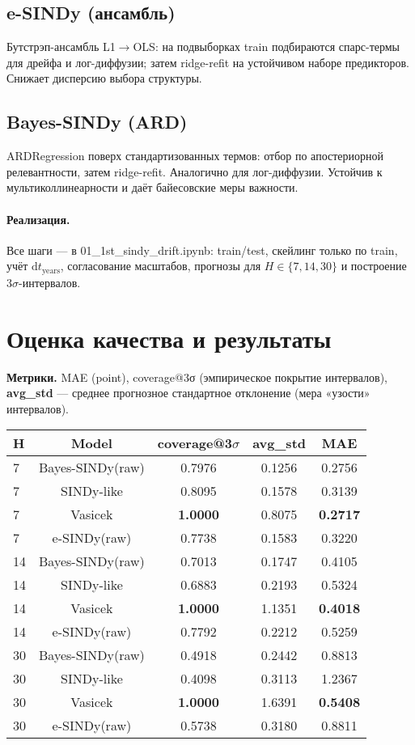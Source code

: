 \documentclass[14pt]{extarticle}
\begin{document}
\subsection*{e-SINDy (ансамбль)}
Бутстрэп-ансамбль L1$\to$OLS: на подвыборках {train} подбираются спарс-термы для дрейфа и лог-диффузии; затем ridge-refit на устойчивом наборе предикторов. Снижает дисперсию выбора структуры.

\subsection*{Bayes-SINDy (ARD)}
{ARDRegression} поверх стандартизованных термов: отбор по апостериорной релевантности, затем ridge-refit. Аналогично для лог-диффузии. Устойчив к мультиколлинеарности и даёт байесовские меры важности.

\paragraph{Реализация.}
Все шаги — в {01\_1st\_sindy\_drift.ipynb}: {train/test}, скейлинг только по {train}, учёт $\mathrm{d}t_{\text{years}}$, согласование масштабов, прогнозы для $H\!\in\!\{7,14,30\}$ и построение $3\sigma$-интервалов.

\section{Оценка качества и результаты}
\textbf{Метрики.} 
MAE (point), coverage@3σ (эмпирическое покрытие интервалов), \textbf{avg\_std} — среднее прогнозное стандартное отклонение (мера «узости» интервалов).

\begin{center}
\begin{tabular}{lcccc}
\toprule
\textbf{H} & \textbf{Model} & \textbf{coverage@3$\sigma$} & \textbf{avg\_std} & \textbf{MAE} \\
\midrule
7  & Bayes-SINDy(raw) & 0.7976 & 0.1256 & 0.2756 \\
7  & SINDy-like       & 0.8095 & 0.1578 & 0.3139 \\
7  & Vasicek          & \textbf{1.0000} & 0.8075 & \textbf{0.2717} \\
7  & e-SINDy(raw)     & 0.7738 & 0.1583 & 0.3220 \\
\midrule
14 & Bayes-SINDy(raw) & 0.7013 & 0.1747 & 0.4105 \\
14 & SINDy-like       & 0.6883 & 0.2193 & 0.5324 \\
14 & Vasicek          & \textbf{1.0000} & 1.1351 & \textbf{0.4018} \\
14 & e-SINDy(raw)     & 0.7792 & 0.2212 & 0.5259 \\
\midrule
30 & Bayes-SINDy(raw) & 0.4918 & 0.2442 & 0.8813 \\
30 & SINDy-like       & 0.4098 & 0.3113 & 1.2367 \\
30 & Vasicek          & \textbf{1.0000} & 1.6391 & \textbf{0.5408} \\
30 & e-SINDy(raw)     & 0.5738 & 0.3180 & 0.8811 \\
\bottomrule
\end{tabular}
\end{center}
\end{document}
